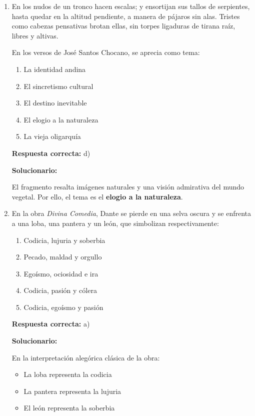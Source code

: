 \begin{enumerate}[resume]
	
	
	\item En los nudos de un tronco hacen escalas; y ensortijan sus tallos de serpientes, hasta quedar en la altitud pendiente, a manera de pájaros sin alas. Tristes como cabezas pensativas brotan ellas, sin torpes ligaduras de tirana raíz, libres y altivas.
	
	En los versos de José Santos Chocano, se aprecia como tema:
	
	\begin{enumerate}[label=\alph*)]
		\item La identidad andina
		\item El sincretismo cultural
		\item El destino inevitable
		\item El elogio a la naturaleza
		\item La vieja oligarquía
	\end{enumerate}
	\textbf{Respuesta correcta:} d)
	
	\vspace{2mm}
	\textbf{Solucionario:}
	
	El fragmento resalta imágenes naturales y una visión admirativa del mundo vegetal.  
	Por ello, el tema es el \textbf{elogio a la naturaleza}.
	
	\vspace{6mm}
	
	\item En la obra \textit{Divina Comedia}, Dante se pierde en una selva oscura y se enfrenta a una loba, una pantera y un león, que simbolizan respectivamente:
	\begin{enumerate}[label=\alph*)]
		\item Codicia, lujuria y soberbia
		\item Pecado, maldad y orgullo
		\item Egoísmo, ociosidad e ira
		\item Codicia, pasión y cólera
		\item Codicia, egoísmo y pasión
	\end{enumerate}
	\textbf{Respuesta correcta:} a)
	
	\vspace{2mm}
	\textbf{Solucionario:}
	
	En la interpretación alegórica clásica de la obra:
	\begin{itemize}
		\item La loba representa la codicia
		\item La pantera representa la lujuria
		\item El león representa la soberbia
	\end{itemize}
	
	\vspace{6mm}
	
\end{enumerate}

